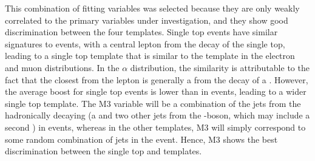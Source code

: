This combination of fitting variables was selected because they are only weakly correlated to the primary
variables under investigation, and they show good discrimination between the four templates.
Single top events have similar signatures to \ttbar events, with a central lepton from the decay of the single
top, leading to a single top template that is similar to the \ttbar template in the electron \abseta and muon
\abseta distributions. In the $\alpha$ distribution, the similarity is attributable to the fact that the
closest \bjet from the lepton is generally a \bjet from the decay of a \tquark. However, the average boost for
single top events is lower than in \ttbar events, leading to a wider single top template.
The M3 variable will be a combination of the jets from the hadronically decaying \tquark (a \bjet and two
other jets from the \W-boson, which may include a second \bjet) in \ttbar events, whereas in the other
templates, M3 will simply correspond to some random combination of jets in the event. Hence, M3 shows the best discrimination between the single top
and \ttbar templates.

